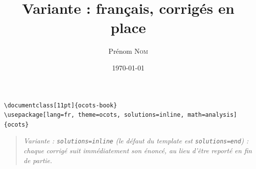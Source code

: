 \documentclass[11pt]{ocots-book}
\title{Variante : français, corrigés en place}
\author{Prénom \textsc{Nom}}
\date{\today}
\newcommand{\ocotsvariantnote}[1]{\begin{quote}\itshape Variante : #1\end{quote}}
\begin{document}
\begin{lstlisting}
\documentclass[11pt]{ocots-book}
\usepackage[lang=fr, theme=ocots, solutions=inline, math=analysis]{ocots}
\end{lstlisting}
\ocotsvariantnote{\texttt{solutions=inline} (le défaut du template est
\texttt{solutions=end}) : chaque corrigé suit immédiatement son énoncé, au
lieu d'être reporté en fin de partie.}

\ocotscollectsolutions

\ocotsprintsolutions
\end{document}
